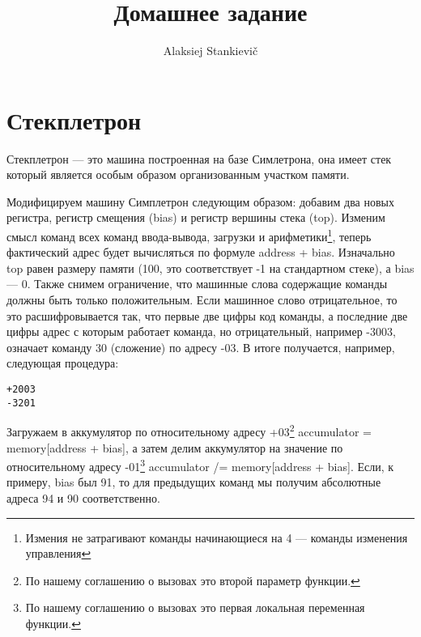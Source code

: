 \documentclass[12pt]{article}
\author{Alaksiej Stankievič}
\title{Домашнее задание}
\begin{document}

\section{Стекплетрон}
Стекплетрон --- это машина построенная на базе Симлетрона, она имеет стек который является особым образом организованным
 участком памяти.

Модифицируем машину Симплетрон следующим образом: добавим два новых регистра, регистр смещения (bias) и регистр вершины
стека (top). Изменим смысл команд всех команд ввода-вывода, загрузки и арифметики\footnote{Измения не затрагивают
команды начинающиеся на 4 --- команды изменения управления}, теперь фактический адрес будет вычисляться по формуле
address + bias. Изначально top равен размеру памяти (100, это соответствует -1 на стандартном стеке), а bias --- 0.
Также снимем ограничение, что машинные слова содержащие команды должны быть только положительным. Если машинное слово
отрицательное, то это расшифровывается так, что первые две цифры код команды, а последние две цифры адрес с которым
работает команда, но отрицательный, например -3003, означает команду 30 (сложение) по адресу -03. В итоге получается,
например, следующая процедура:
\begin{verbatim}
+2003
-3201
\end{verbatim}
Загружаем в аккумулятор по относительному адресу +03\footnote{По нашему соглашению о вызовах это второй параметр
функции.} accumulator = memory[address + bias], а затем делим аккумулятор на значение по относительному адресу
-01\footnote{По нашему соглашению о вызовах это первая локальная переменная функции.} accumulator /= memory[address +
bias]. Если, к примеру, bias был 91, то для предыдущих команд мы получим абсолютные адреса 94 и 90 соответственно.
\end{document}
